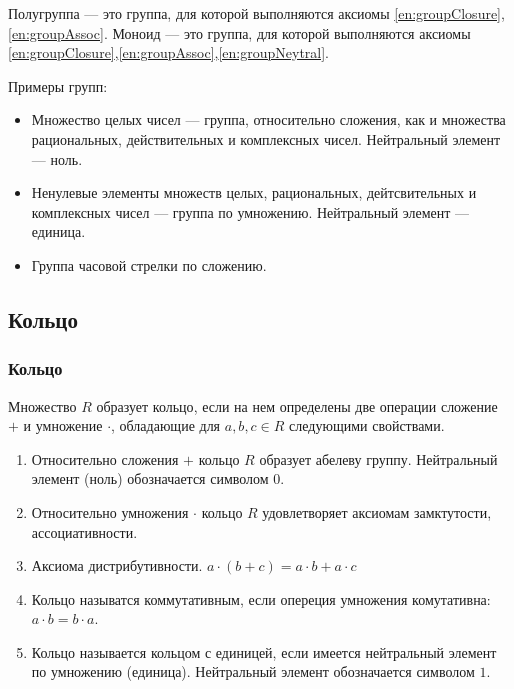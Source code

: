 \alert{Полугруппа} --- это группа, для которой выполняются аксиомы \ref{en:groupClosure},\ref{en:groupAssoc}. \alert{Моноид} --- это группа, для которой выполняются аксиомы \ref{en:groupClosure},\ref{en:groupAssoc},\ref{en:groupNeytral}.

Примеры групп: 
\begin{itemize}
    \item Множество целых чисел --- группа, относительно сложения, как и множества рациональных, действительных и комплексных чисел. Нейтральный элемент --- ноль.
    \item Ненулевые элементы множеств целых, рациональных, дейтсвительных и комплексных чисел --- группа по умножению. Нейтральный элемент --- единица.
    \item Группа часовой стрелки по сложению.
\end{itemize}


\subsection{Кольцо}


\begin{frame}
    \frametitle{Кольцо}
    
    \begin{definition}
        Множество $R$ образует \alert{кольцо}, если на нем определены \alert{две} операции \alert{сложение} $+$ и \alert{умножение} $\cdot$, обладающие для $a,b,c\in R$ следующими свойствами.
        \begin{enumerate}
            \item Относительно \alert{сложения} $+$ кольцо $R$ образует \alert{абелеву} группу. Нейтральный элемент (ноль) обозначается символом $0$.
            \item Относительно \alert{умножения} $\cdot$ кольцо $R$ удовлетворяет аксиомам \alert{замктутости}, \alert{ассоциативности}.
            \item Аксиома \alert{дистрибутивности}. $a\cdot(b+c) = a\cdot b + a\cdot c$
            \item<2-> Кольцо называтся \alert{коммутативным}, если опереция \alert{умножения} комутативна: $a\cdot b = b\cdot a$.
            \item<3-> Кольцо называется кольцом \alert{с единицей}, если имеется нейтральный элемент по умножению (единица). Нейтральный элемент обозначается символом $1$.
        \end{enumerate}
    \end{definition}
\end{frame}


